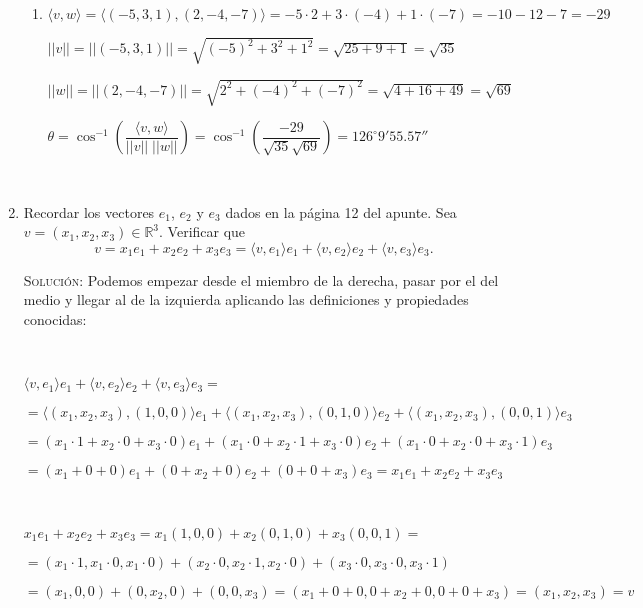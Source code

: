 \documentclass[a4paper,12pt,twoside,spanish,reqno]{amsbook}
\numberwithin{equation}{section}
\newcommand{\rta}{\noindent\textsc{Solución: }}
\begin{document}
\begin{enumerate}
\begin{enumerate}
\item $\langle v , w  \rangle = \langle (-5,3,1) , (2,-4,-7)  \rangle = -5 \cdot 2 + 3 \cdot (-4) + 1 \cdot (-7) = -10 -12-7 = \boxed{-29}$

$||v||=||(-5,3,1)|| = \sqrt{(-5)^2 + 3^2 + 1^2} = \sqrt{25+9+1} = \sqrt{35}$

$||w||=||(2,-4,-7)|| = \sqrt{2^2 + (-4)^2 + (-7)^2} = \sqrt{4+16+49} = \sqrt{69}$

$\theta = \cos^{-1} \left( \dfrac{\langle v,w \rangle}{||v|| \; ||w||} \right) = \cos^{-1} \left( \dfrac{ -29 }{ \sqrt{35} \sqrt{69} } \right) = \boxed{126^\circ 9'55.57''}$
\end{enumerate}

\

\item Recordar los vectores $e_1$, $e_2$ y $e_3$ dados en la p\'agina 12 del apunte. Sea $v=(x_1,x_2,x_3)\in\mathbb{R}^3$.  Verificar que 
$$v=x_1e_1+x_2e_2+x_3e_3=\langle v,e_1\rangle e_1+\langle v,e_2\rangle e_2+\langle v,e_3\rangle e_3.$$

\rta Podemos empezar desde el miembro de la derecha, pasar por el del medio y llegar al de la izquierda aplicando las definiciones y propiedades conocidas:

\

$ \langle v,e_1\rangle e_1+\langle v,e_2\rangle e_2+\langle v,e_3\rangle e_3 = $

$= \langle (x_1,x_2,x_3),(1,0,0)\rangle e_1+\langle (x_1,x_2,x_3),(0,1,0)\rangle e_2+\langle (x_1,x_2,x_3),(0,0,1)\rangle e_3 $

$= (x_1 \cdot 1 + x_2 \cdot 0 + x_3 \cdot 0) e_1+ (x_1 \cdot 0 + x_2 \cdot 1 + x_3 \cdot 0) e_2+ (x_1 \cdot 0 + x_2 \cdot 0 + x_3 \cdot 1) e_3 $

$= (x_1 + 0 + 0) e_1+ (0 + x_2 + 0) e_2+ (0 + 0 + x_3) e_3 = \boxed{x_1 e_1+ x_2 e_2 + x_3 e_3}$

\

$x_1 e_1+ x_2 e_2 + x_3 e_3 = x_1 (1,0,0) + x_2 (0,1,0) + x_3 (0,0,1) = $

$= (x_1 \cdot 1,x_1 \cdot 0,x_1 \cdot 0) + (x_2 \cdot 0, x_2 \cdot 1 , x_2 \cdot 0 ) + (x_3 \cdot 0 , x_3 \cdot 0 , x_3 \cdot 1) $

$= (x_1,0,0)+(0,x_2,0)+(0,0,x_3) = (x_1+0+0,0+x_2+0,0+0+x_3) = (x_1,x_2,x_3) = \boxed{v}$

\


\end{enumerate}
\end{document}
